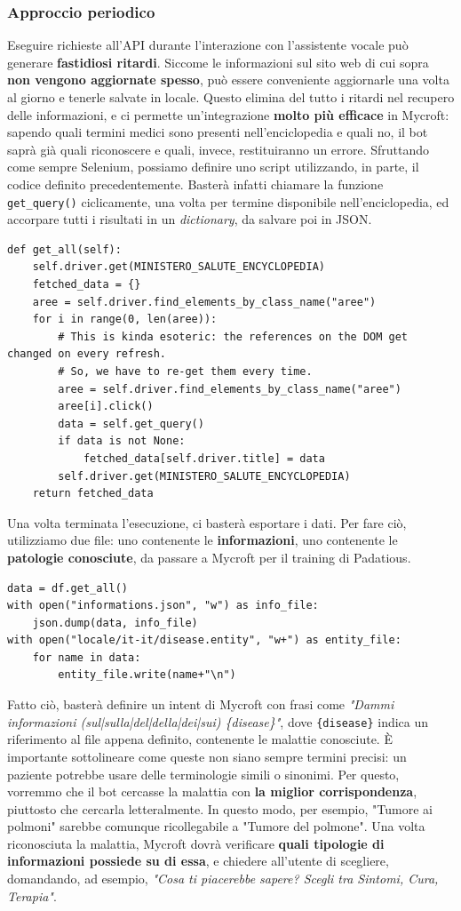 \subsubsection{Approccio periodico}
Eseguire richieste all'API durante l'interazione con l'assistente vocale può generare \textbf{fastidiosi ritardi}. Siccome le informazioni sul sito web di cui sopra \textbf{non vengono aggiornate spesso}, può essere conveniente aggiornarle una volta al giorno e tenerle salvate in locale. Questo elimina del tutto i ritardi nel recupero delle informazioni, e ci permette un'integrazione \textbf{molto più efficace} in Mycroft: sapendo quali termini medici sono presenti nell'enciclopedia e quali no, il bot saprà già quali riconoscere e quali, invece, restituiranno un errore. Sfruttando come sempre Selenium, possiamo definire uno script utilizzando, in parte, il codice definito precedentemente. Basterà infatti chiamare la funzione \texttt{get\_query()} ciclicamente, una volta per termine disponibile nell'enciclopedia, ed accorpare tutti i risultati in un \textit{dictionary}, da salvare poi in JSON.
\begin{verbatim}
def get_all(self):
    self.driver.get(MINISTERO_SALUTE_ENCYCLOPEDIA)
    fetched_data = {}
    aree = self.driver.find_elements_by_class_name("aree")
    for i in range(0, len(aree)):
        # This is kinda esoteric: the references on the DOM get changed on every refresh. 
        # So, we have to re-get them every time.
        aree = self.driver.find_elements_by_class_name("aree")
        aree[i].click()
        data = self.get_query()
        if data is not None:
            fetched_data[self.driver.title] = data
        self.driver.get(MINISTERO_SALUTE_ENCYCLOPEDIA)
    return fetched_data
\end{verbatim}
Una volta terminata l'esecuzione, ci basterà esportare i dati. Per fare ciò, utilizziamo due file: uno contenente le \textbf{informazioni}, uno contenente le \textbf{patologie conosciute}, da passare a Mycroft per il training di Padatious.
\begin{verbatim}
data = df.get_all()
with open("informations.json", "w") as info_file:
    json.dump(data, info_file)
with open("locale/it-it/disease.entity", "w+") as entity_file:
    for name in data:
        entity_file.write(name+"\n")
\end{verbatim}
Fatto ciò, basterà definire un intent di Mycroft con frasi come \textit{"Dammi informazioni (sul|sulla|del|della|dei|sui) \{disease\}"}, dove \texttt{\{disease\}} indica un riferimento al file appena definito, contenente le malattie conosciute. È importante sottolineare come queste non siano sempre termini precisi: un paziente potrebbe usare delle terminologie simili o sinonimi. Per questo, vorremmo che il bot cercasse la malattia con \textbf{la miglior corrispondenza}, piuttosto che cercarla letteralmente. In questo modo, per esempio, "Tumore ai polmoni" sarebbe comunque ricollegabile a "Tumore del polmone". Una volta riconosciuta la malattia, Mycroft dovrà verificare \textbf{quali tipologie di informazioni possiede su di essa}, e chiedere all'utente di scegliere, domandando, ad esempio, \textit{"Cosa ti piacerebbe sapere? Scegli tra Sintomi, Cura, Terapia"}.
